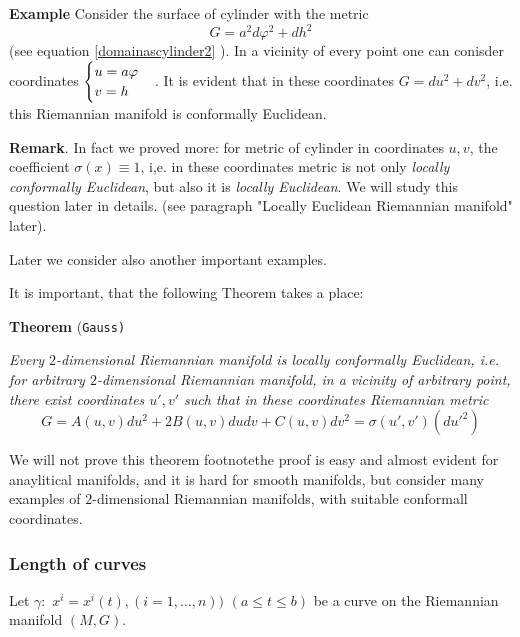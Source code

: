 \documentclass[12pt]{article}
\theoremstyle{theorem}
\numberwithin{equation}{section}
\begin{document}
{\bf Example}    Consider the surface of cylinder with the metric
                 \begin{equation}
           G=a^2d\varphi^2+dh^2
                  \end{equation}
(see equation \eqref{domainascylinder2} ).  
In a vicinity of every point one
can conisder coordinates $\begin{cases}u=a\varphi\cr v=h\cr\end{cases}$.
It is evident that in these coordinates 
$G=du^2+dv^2$, i.e. this Riemannian
manifold is conformally Euclidean. 

  {\bf Remark}. In fact we proved more: for metric of cylinder in
coordinates $u,v$, the coefficient $\sigma(x)\equiv 1$, i,e. in these coordinates  metric is  not only {\it locally conformally Euclidean}, 
but also it is  {\it locally Euclidean}.  
We will study this question later
in details. (see  
paragraph "Locally Euclidean Riemannian manifold" later).

Later we consider also another important examples.

It is important, that 
the following Theorem takes  a place:

   {\bf Theorem} {(\tt Gauss)}   {\it Every $2$-dimensional 
Riemannian manifold is locally
  conformally Euclidean, i.e. for arbitrary $2$-dimensional Riemannian 
manifold, in a vicinity of arbitrary point, there exist coordinates
$u',v'$  such that in these coordinates
 Riemannian metric
                \begin{equation}\label{gaussconformally}
     G=A(u,v)du^2+2B(u,v)dudv+C(u,v)dv^2=
         \sigma(u',v')\left({du'}^2\right)
                \end{equation}


}
We will not prove this theorem
footnote{the proof is easy and almost evident for anaylitical manifolds,
and it is hard for smooth manifolds}, but consider many examples
of $2$-dimensional Riemannian manifolds, with suitable
conformall coordinates.



\subsubsection {Length of  curves}

Let $\gamma\colon\,\, x^i=x^i(t), (i=1,\dots,n))$
 $(a\leq t\leq b)$ be a curve on the Riemannian manifold $(M,G)$.
\end{document}
